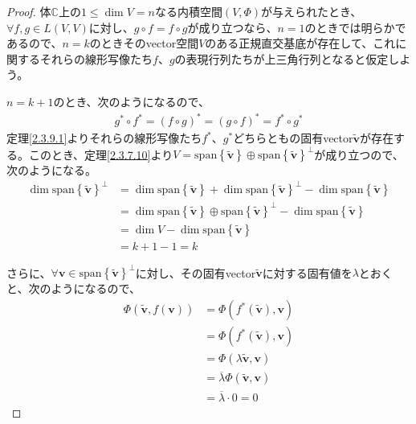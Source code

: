 \documentclass[dvipdfmx]{jsarticle}
\begin{document}
\begin{proof}
体$\mathbb{C}$上の$1 \leq \dim V = n$なる内積空間$(V,\varPhi)$が与えられたとき、$\forall f,g \in L(V,V)$に対し、$g \circ f = f \circ g$が成り立つなら、$n = 1$のときでは明らかであるので、$n = k$のときそのvector空間$V$のある正規直交基底が存在して、これに関するそれらの線形写像たち$f$、$g$の表現行列たちが上三角行列となると仮定しよう。\par
$n = k + 1$のとき、次のようになるので、
\begin{align*}
g^{*} \circ f^{*} = (f \circ g)^{*} = (g \circ f)^{*} = f^{*} \circ g^{*}
\end{align*}
定理\ref{2.3.9.1}よりそれらの線形写像たち$f^{*}$、$g^{*}$どちらともの固有vector$\widetilde{\mathbf{v}}$が存在する。このとき、定理\ref{2.3.7.10}より$V = {\mathrm{span}}\left\{ \widetilde{\mathbf{v}} \right\} \oplus {{\mathrm{span}}\left\{ \widetilde{\mathbf{v}} \right\}}^{\bot}$が成り立つので、次のようになる。
\begin{align*}
\dim{{\mathrm{span}}\left\{ \widetilde{\mathbf{v}} \right\}}^{\bot} &= \dim{{\mathrm{span}}\left\{ \widetilde{\mathbf{v}} \right\}} + \dim{{\mathrm{span}}\left\{ \widetilde{\mathbf{v}} \right\}}^{\bot} - \dim{{\mathrm{span}}\left\{ \widetilde{\mathbf{v}} \right\}}\\
&= \dim{{\mathrm{span}}\left\{ \widetilde{\mathbf{v}} \right\} \oplus {{\mathrm{span}}\left\{ \widetilde{\mathbf{v}} \right\}}^{\bot}} - \dim{{\mathrm{span}}\left\{ \widetilde{\mathbf{v}} \right\}}\\
&= \dim V - \dim{{\mathrm{span}}\left\{ \widetilde{\mathbf{v}} \right\}}\\
&= k + 1 - 1 = k
\end{align*}\par
さらに、$\forall\mathbf{v} \in {{\mathrm{span}}\left\{ \widetilde{\mathbf{v}} \right\}}^{\bot}$に対し、その固有vector$\widetilde{\mathbf{v}}$に対する固有値を$\lambda$とおくと、次のようになるので、
\begin{align*}
\varPhi\left( \widetilde{\mathbf{v}},f\left( \mathbf{v} \right) \right) &= \varPhi\left( f^{*}\left( \widetilde{\mathbf{v}} \right),\mathbf{v} \right)\\
&= \varPhi\left( f^{*}\left( \widetilde{\mathbf{v}} \right),\mathbf{v} \right)\\
&= \varPhi\left( \lambda\widetilde{\mathbf{v}},\mathbf{v} \right)\\
&= \overline{\lambda}\varPhi\left( \widetilde{\mathbf{v}},\mathbf{v} \right)\\
&= \overline{\lambda} \cdot 0 = 0

\end{align*}
\end{proof}
\end{document}
